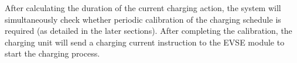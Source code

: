 \documentclass[
english,
ruledheaders=section,%
class=report,%
thesis={type=Report},%
accentcolor=9c,%
custommargins=true,%
marginpar=false,%
parskip=half-,%
fontsize=11pt,%
logofile={img/tuda_logo.pdf}, %
]{tudapub}
\begin{document}
\begin{enumerate}[label=\Alph*.]



        After calculating the duration of the current charging action, the system will simultaneously check whether periodic calibration of the charging schedule is required (as detailed in the later sections). After completing the calibration, the charging unit will send a charging current instruction to the EVSE module to start the charging process.


\end{enumerate}
\end{document}
